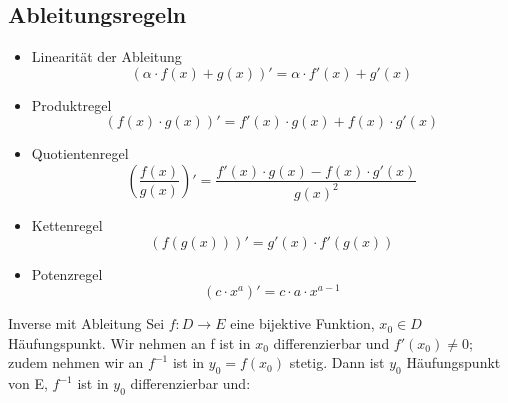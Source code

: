 \documentclass[a4paper,10pt]{article}
\begin{document}
\subsection{Ableitungsregeln}

\begin{itemize}
  \item Linearität der Ableitung
  $$(\alpha \cdot f(x) + g(x))' = \alpha \cdot f'(x) + g'(x)$$
  \item Produktregel
  $$(f(x) \cdot g(x))' = f'(x) \cdot g(x) + f(x) \cdot g'(x)$$
  \item Quotientenregel
  $$\left(\frac{f(x)}{g(x)}\right)' = \frac{f'(x) \cdot g(x) - f(x) \cdot g'(x)}{g(x)^2}$$
  \item Kettenregel
  $$(f(g(x)))' = g'(x) \cdot f'(g(x))$$
  \item Potenzregel
  $$(c \cdot x^a)' = c \cdot a \cdot x^{a - 1}$$
\end{itemize}

\begin{subbox}{Inverse mit Ableitung}
  Sei $f: D\to E$ eine bijektive Funktion, $x_0 \in D$ Häufungspunkt. Wir nehmen an f ist in $x_0$ differenzierbar und $f'(x_0) \neq 0$; zudem nehmen wir an $f^{-1}$ ist in $y_0 = f(x_0)$ stetig. Dann ist $y_0$ Häufungspunkt von E, $f^{-1}$ ist in $y_0$ differenzierbar und:\\ 
\end{subbox}
\end{document}
